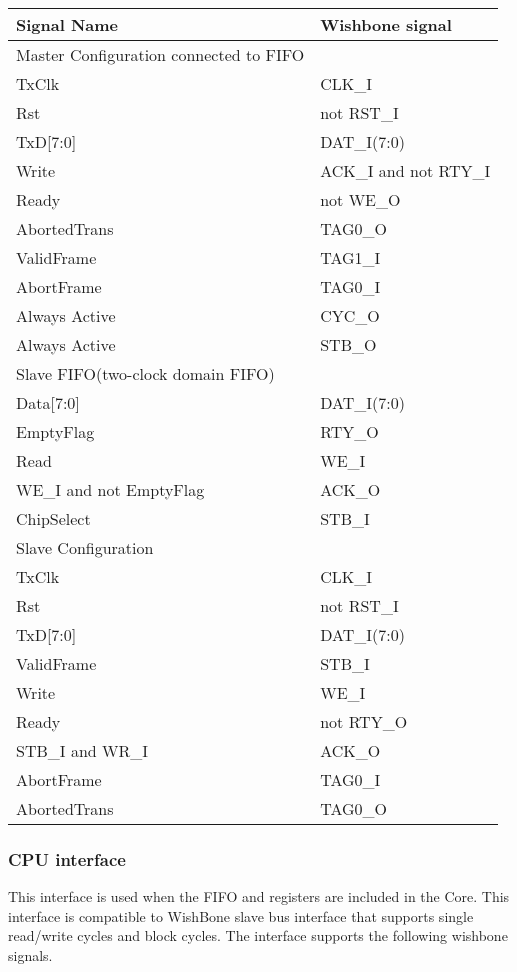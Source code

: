 \documentclass[a4paper,11pt]{article}
\begin{document}
\begin{tabular}{|l|l|}
\hline
Signal Name& Wishbone signal\\
\hline
\hline
Master Configuration connected to FIFO&\\
\hline
TxClk & CLK\_I\\
Rst & not RST\_I\\
TxD[7:0]& DAT\_I(7:0)\\
Write& ACK\_I and not RTY\_I\\
Ready& not WE\_O\\
AbortedTrans& TAG0\_O\\
ValidFrame& TAG1\_I\\
AbortFrame& TAG0\_I\\
Always Active & CYC\_O\\
Always Active & STB\_O\\
\hline
Slave FIFO(two-clock domain FIFO)&\\
\hline
Data[7:0]& DAT\_I(7:0)\\
EmptyFlag& RTY\_O\\
Read& WE\_I\\
WE\_I and not EmptyFlag& ACK\_O\\
ChipSelect& STB\_I\\
\hline
Slave Configuration &\\
\hline
TxClk & CLK\_I\\
Rst & not RST\_I\\
TxD[7:0]& DAT\_I(7:0)\\
ValidFrame& STB\_I\\
Write&  WE\_I\\
Ready& not RTY\_O\\
STB\_I and WR\_I& ACK\_O\\
AbortFrame& TAG0\_I\\
AbortedTrans& TAG0\_O\\
\hline
\end{tabular}


\subsubsection{CPU interface}
This interface is used when the FIFO and registers are included in the Core. This interface is compatible to WishBone slave bus interface that supports single read/write cycles and block cycles. The interface supports the following wishbone signals.
\end{document}

